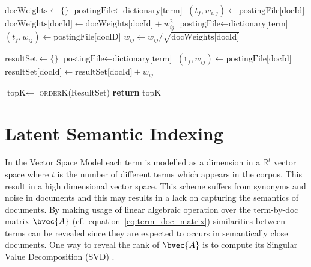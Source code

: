 \begin{algorithm}
\caption{Document vectors normalization algorithm}%
\begin{algorithmic}[1]
\State $\mbox{docWeights} \gets \{\}$
	\State $\mbox{postingFile} \gets \mbox{dictionary[term]}$
		\State $(t_f, w_{i,j}) \gets \mbox{postingFile[docId]}$
		\State $\mbox{docWeights[docId]} \gets \mbox{docWeights[docId]} + w_{ij}^2$
	\EndFor
\EndFor
{}
	\State $\mbox{postingFile} \gets \mbox{dictionary[term]}$
		\State $(t_f, w_{ij}) \gets \mbox{postingFile[docID]}$
		\State $w_{ij} \gets w_{ij} / \sqrt{\mbox{docWeights[docId]}}$
	\EndFor
\EndFor
\EndProcedure
\end{algorithmic}
\end{algorithm}

\begin{algorithm}
\caption{Computation of the $k$ best documents}%
\begin{algorithmic}[1]
\State $\mbox{resultSet} \gets \{\}$
		\State $\mbox{postingFile} \gets \mbox{dictionary[term]}$
			\State $(\mbox{t}_f, w_{ij}) \gets \mbox{postingFile[docId]}$
			\State $\mbox{resultSet[docId]} \gets \mbox{resultSet[docId]} + w_{ij}$
		\EndFor

	\EndIf
\EndFor
\State $\mbox{topK} \gets$ \textsc{orderK}(ResultSet)
\State \textbf{return} topK
\EndFunction
\end{algorithmic}
\end{algorithm}






\section{\label{sec:LSI}Latent Semantic Indexing}
In the Vector Space Model each term is modelled as a dimension in a $\mathbb{R}^t$ vector space where $t$ is the number of different terms which appears in the corpus. This result in a high dimensional vector space. This scheme suffers from synonyms and noise in documents and this may results in a lack on capturing the semantics of documents. By making usage of linear algebraic operation over the term-by-doc matrix $\bvec{A}$ (cf.\ equation~\ref{eq:term_doc_matrix}) similarities between terms can be revealed since they are expected to occurs in semantically close documents. One way to reveal the rank of $\bvec{A}$ is to compute its Singular Value Decomposition (SVD) \cite{berry1999mvs, chakrabarti2003mwd}.

